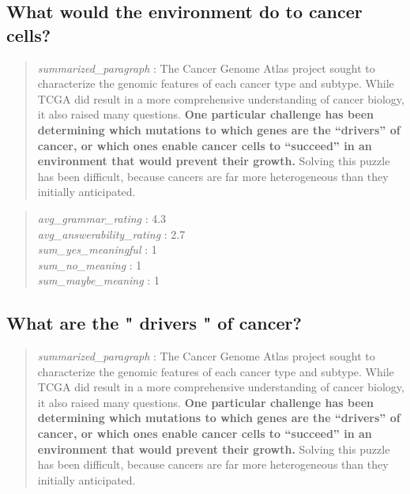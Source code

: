 \hypertarget{what-would-the-environment-do-to-cancer-cells}{%
\subsection{What would the environment do to cancer
cells?}\label{what-would-the-environment-do-to-cancer-cells}}

\begin{quote}
\emph{summarized\_paragraph} : The Cancer Genome Atlas project sought to
characterize the genomic features of each cancer type and subtype. While
TCGA did result in a more comprehensive understanding of cancer biology,
it also raised many questions. \textbf{One particular challenge has been
determining which mutations to which genes are the ``drivers'' of
cancer, or which ones enable cancer cells to ``succeed'' in an
environment that would prevent their growth.} Solving this puzzle has
been difficult, because cancers are far more heterogeneous than they
initially anticipated.
\end{quote}

\begin{quote}
\emph{avg\_grammar\_rating} : 4.3\\
\emph{avg\_answerability\_rating} : 2.7\\
\emph{sum\_yes\_meaningful} : 1\\
\emph{sum\_no\_meaning} : 1\\
\emph{sum\_maybe\_meaning} : 1
\end{quote}

\hypertarget{what-are-the-drivers-of-cancer}{%
\subsection{What are the " drivers " of
cancer?}\label{what-are-the-drivers-of-cancer}}

\begin{quote}
\emph{summarized\_paragraph} : The Cancer Genome Atlas project sought to
characterize the genomic features of each cancer type and subtype. While
TCGA did result in a more comprehensive understanding of cancer biology,
it also raised many questions. \textbf{One particular challenge has been
determining which mutations to which genes are the ``drivers'' of
cancer, or which ones enable cancer cells to ``succeed'' in an
environment that would prevent their growth.} Solving this puzzle has
been difficult, because cancers are far more heterogeneous than they
initially anticipated.
\end{quote}

